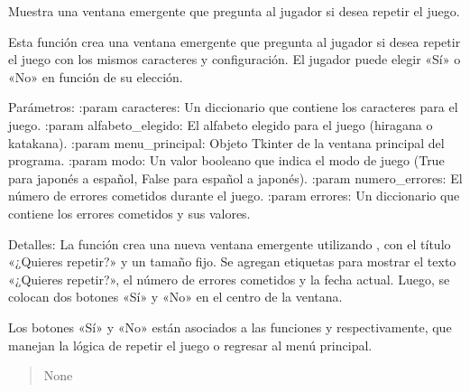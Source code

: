\documentclass[letterpaper,10pt,spanish]{sphinxmanual}
\begin{document}
\begin{fulllineitems}
\begin{fulllineitems}
\begin{quote}
\begin{description}
\end{description}\end{quote}

\end{fulllineitems}


\begin{fulllineitems}
\label{\detokenize{juego:juego.Juego.repetir}}
\pysigstartsignatures
{}
\pysigstopsignatures
\sphinxAtStartPar
Muestra una ventana emergente que pregunta al jugador si desea repetir el juego.

\sphinxAtStartPar
Esta función crea una ventana emergente que pregunta al jugador si desea repetir el juego
con los mismos caracteres y configuración. El jugador puede elegir «Sí» o «No» en función
de su elección.

\sphinxAtStartPar
Parámetros:
:param caracteres: Un diccionario que contiene los caracteres para el juego.
:param alfabeto\_elegido: El alfabeto elegido para el juego (hiragana o katakana).
:param menu\_principal: Objeto Tkinter de la ventana principal del programa.
:param modo: Un valor booleano que indica el modo de juego (True para japonés a español, False para español a
japonés).
:param numero\_errores: El número de errores cometidos durante el juego.
:param errores: Un diccionario que contiene los errores cometidos y sus valores.

\sphinxAtStartPar
Detalles:
La función crea una nueva ventana emergente utilizando , con el título «¿Quieres repetir?»
y un tamaño fijo. Se agregan etiquetas para mostrar el texto «¿Quieres repetir?», el número de errores
cometidos y la fecha actual. Luego, se colocan dos botones «Sí» y «No» en el centro de la ventana.

\sphinxAtStartPar
Los botones «Sí» y «No» están asociados a las funciones  y  respectivamente,
que manejan la lógica de repetir el juego o regresar al menú principal.
\begin{quote}\begin{description}
\sphinxAtStartPar
None


\end{description}
\end{quote}
\end{fulllineitems}
\end{fulllineitems}
\end{document}
